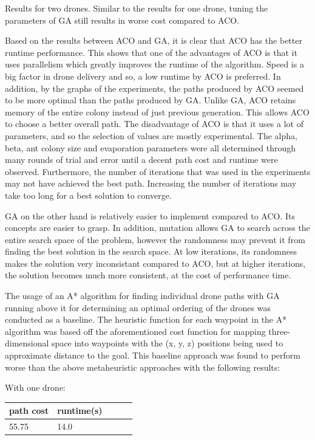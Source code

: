 \documentclass[conference]{IEEEtran}
\begin{document}
Results for two drones. Similar to the results for one drone, tuning the parameters of GA still results in worse cost compared to ACO. 

Based on the results between ACO and GA, it is clear that ACO has the better runtime performance. This shows that one of the advantages of ACO is that it uses parallelism which greatly improves the runtime of the algorithm. Speed is a big factor in drone delivery and so, a low runtime by ACO is preferred. In addition, by the graphs of the experiments, the paths produced by ACO seemed to be more optimal than the paths produced by GA. Unlike GA, ACO retains memory of the entire colony instead of just previous generation. This allows ACO to choose a better overall path. The disadvantage of ACO is that it uses a lot of parameters, and so the selection of values are mostly experimental. The alpha, beta, ant colony size and evaporation parameters were all determined through many rounds of trial and error until a decent path cost and runtime were observed. Furthermore, the number of iterations that was used in the experiments may not have achieved the best path. Increasing the number of iterations may take too long for a best solution to converge.

GA on the other hand is relatively easier to implement compared to ACO. Its concepts are easier to grasp. In addition, mutation allows GA to search across the entire search space of the problem, however the randomness may prevent it from finding the best solution in the search space. At low iterations, its randomness makes the solution very inconsistant compared to ACO, but at higher iterations, the solution becomes much more consistent, at the cost of performance time.

The usage of an A* algorithm for finding individual drone paths with GA running above it for determining an optimal ordering of the drones was conducted as a baseline. The heuristic function for each waypoint in the A* algorithm was based off the aforementioned cost function for mapping three-dimensional space into waypoints with the (x, y, z) positions being used to approximate distance to the goal. This baseline approach was found to perform worse than the above metaheuristic approaches with the following results:

With one drone:
\begin{center}
\begin{tabular}{ | m{1cm} | m{1cm}| m{1cm} | m{1.5cm} | m{1.5cm} |} 
\hline
path cost & runtime(s) \\ 
\hline
55.75 & 14.0 \\
\hline
\end{tabular}
\end{center}
\end{document}
